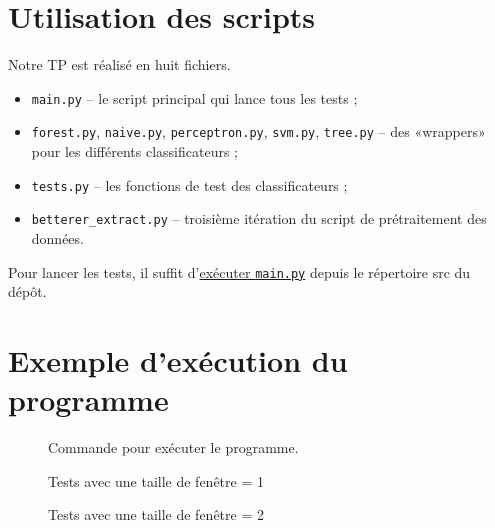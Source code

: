 \documentclass[11pt]{rapport-tp-ia}
\begin{document}
\renewcommand\thesection{\Alph{section}}
\renewcommand\thesubsection{\thesection.\Alph{subsection}}
\begin{appendices}
	\clearpage
		
		
	\section{Utilisation des scripts}
	Notre TP est réalisé en huit fichiers.
	\begin{itemize}
		\item \texttt{main.py} -- le script principal qui lance tous les tests ;
		\item  \texttt{forest.py}, \texttt{naive.py}, \texttt{perceptron.py}, \texttt{svm.py}, \texttt{tree.py} -- des «wrappers» pour les différents classificateurs ;
		\item \texttt{tests.py} -- les fonctions de test des classificateurs ;
		\item \texttt{betterer\_extract.py} -- troisième itération du script de prétraitement des données.
	\end{itemize}
		
	Pour lancer les tests, il suffit d'\hyperref[fig:exec]{exécuter \texttt{main.py}} depuis le répertoire src du dépôt.
	\section{Exemple d'exécution du programme}
	
	\begin{figure}[ht]
		\centering
		\caption{Commande pour exécuter le programme.\protect\footnotemark}
				
		\label{fig:exec}
	\end{figure}
	 
	
	 
	\begin{figure}[ht]
		\centering
		\caption{Tests avec une taille de fenêtre = 1}
				
		\label{fig:window1}
	\end{figure}
		   
	\begin{figure}[ht]
		\centering
		\caption{Tests avec une taille de fenêtre = 2}
				

\end{figure}
\end{appendices}
\end{document}
